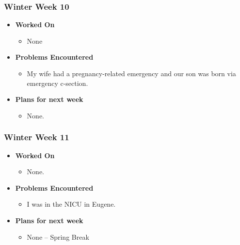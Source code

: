 \documentclass[compsoc,draftclsnofoot,onecolumn,10pt]{IEEEtran}
\begin{document}
\subsubsection{Winter Week 10}
\begin{itemize}
    \item {\textbf{Worked On}}
    \begin{itemize}
        \item None
    \end{itemize}

    \item {\textbf{Problems Encountered}}
    \begin{itemize}
        \item My wife had a pregnancy-related emergency and our son was born via emergency c-section.
    \end{itemize}

    \item{\textbf{Plans for next week}}
    \begin{itemize}
        \item None.
    \end{itemize}
\end{itemize}

\subsubsection{Winter Week 11}
\begin{itemize}
    \item {\textbf{Worked On}}
    \begin{itemize}
        \item None.
    \end{itemize}

    \item {\textbf{Problems Encountered}}
    \begin{itemize}
        \item I was in the NICU in Eugene.
    \end{itemize}

    \item{\textbf{Plans for next week}}
    \begin{itemize}
        \item None -- Spring Break
    \end{itemize}
\end{itemize}
\end{document}
